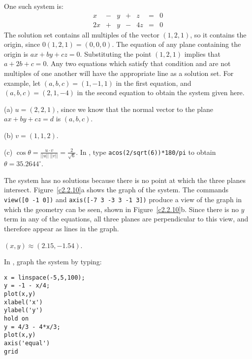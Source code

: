 \documentclass{ximera}
\begin{document}
\ans One such system is:
\[
\begin{array}{rrrrrrr}
x & - & y & + & z & = & 0 \\
2x & + & y & - & 4z & = & 0\end{array}
\]
\soln The solution set contains all multiples of the vector $(1,2,1)$,
so it contains the origin, since $0(1,2,1) = (0,0,0)$.  The equation
of any plane containing the origin is $ax + by + cz = 0$. 
Substituting the point $(1,2,1)$ implies that $a + 2b + c = 0$. 
Any two equations which satisfy that condition and are not multiples
of one another will have the appropriate line as a solution set. 
For example, let $(a,b,c) = (1,-1,1)$ in the first equation, and
$(a,b,c) = (2,1,-4)$ in the second equation to obtain the system
given here.



(a) $u = (2,2,1)$, since we know that the normal vector to the plane
$ax + by + cz = d$ is $(a,b,c)$.

(b) $v = (1,1,2)$.

(c) $\cos\theta = \frac{u \cdot v}{||u||\;||v||} = \frac{2}{\sqrt{6}}$.
In \Matlabp, type {\tt acos(2/sqrt(6))*180/pi} to obtain $\theta =
35.2644^\circ$.

The system has no solutions because there is no point at which the three
planes intersect.  Figure~\ref{c2.2.10}a shows the \Matlab graph of
the system.  The commands {\tt view([0 -1 0])} and 
{\tt axis([-7 3 -3 3 -1 3])}
produce a view of the graph in which the geometry
can be seen, shown in Figure~\ref{c2.2.10}b.
Since there is no $y$ term in any of the equations, all three planes
are perpendicular to this view, and therefore appear as lines in the
graph.

\begin{figure}[htb]
                       \centerline{%
                       }
\end{figure}





\ans $(x,y) \approx (2.15,-1.54)$.

\soln In \Matlab, graph the system by typing:
\begin{verbatim}
x = linspace(-5,5,100);
y = -1 - x/4;
plot(x,y)
xlabel('x')
ylabel('y')
hold on
y = 4/3 - 4*x/3;
plot(x,y)
axis('equal')
grid
\end{verbatim}
\end{document}

